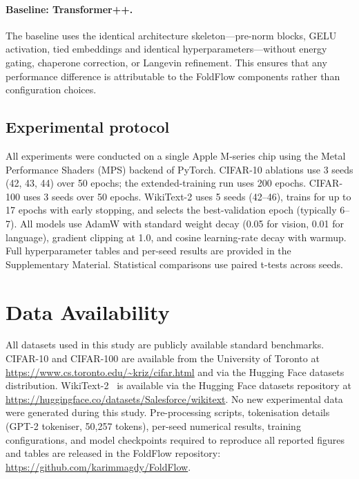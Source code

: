 \documentclass[fleqn,10pt]{article}
\begin{document}
\paragraph{Baseline: Transformer++.}
The baseline uses the identical architecture skeleton---pre-norm
blocks,\cite{ba2016layer} GELU activation, tied embeddings and
identical hyperparameters---without energy gating, chaperone
correction, or Langevin refinement. This ensures that any
performance difference is attributable to the FoldFlow components
rather than configuration choices.

\subsection*{Experimental protocol}

All experiments were conducted on a single Apple M-series chip using
the Metal Performance Shaders (MPS) backend of
PyTorch. CIFAR-10 ablations use 3 seeds (42, 43, 44) over 50
epochs; the extended-training run uses 200 epochs. CIFAR-100 uses 3
seeds over 50 epochs. WikiText-2 uses 5 seeds (42--46), trains for up
to 17 epochs with early stopping, and selects the best-validation
epoch (typically 6--7). All models use AdamW with standard weight
decay (0.05 for vision, 0.01 for language), gradient clipping at
1.0, and cosine learning-rate decay with warmup. Full hyperparameter
tables and per-seed results are provided in the Supplementary
Material. Statistical comparisons use paired t-tests across seeds.

\section*{Data Availability}
\label{sec:data}
All datasets used in this study are publicly available standard
benchmarks. CIFAR-10 and CIFAR-100 are available from the University
of Toronto at \url{https://www.cs.toronto.edu/~kriz/cifar.html} and
via the Hugging Face datasets distribution.\cite{krizhevsky2009cifar}
WikiText-2~\cite{merity2017pointer} is available via the Hugging Face
datasets repository at \url{https://huggingface.co/datasets/Salesforce/wikitext}.
No new experimental data were generated during this study.
Pre-processing scripts, tokenisation details (GPT-2 tokeniser,
50{,}257 tokens), per-seed numerical results, training
configurations, and model checkpoints required to reproduce all
reported figures and tables are released in the FoldFlow repository:
\url{https://github.com/karimmagdy/FoldFlow}.
\end{document}
